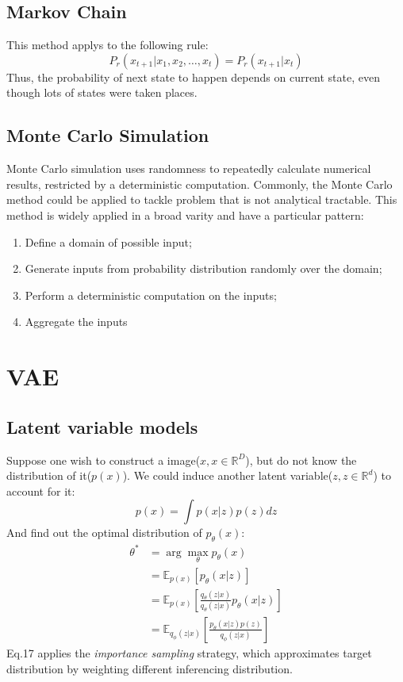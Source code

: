 \documentclass{article}
\newcommand{\argmax}{\arg\!\max}
\begin{document}
{\subsection{Markov Chain}
This method applys to the following rule:
\[
P_{r}(x_{t+1}|x_{1},x_{2},\dots ,x_{t}) = P_{r}(x_{t+1}|x_{t})
\]
Thus, the probability of next state to happen depends on current state, even though lots of states were taken places.
\subsection{Monte Carlo Simulation}
Monte Carlo simulation uses randomness to repeatedly calculate numerical results, restricted by a deterministic computation. Commonly, the Monte Carlo method could be applied to tackle problem that is not analytical tractable. This method is widely applied in a broad varity and have a particular pattern: \\
\begin{enumerate}
\item Define a domain of possible input;
\item Generate inputs from probability distribution randomly over the domain;
\item Perform a deterministic computation on the inputs;
\item Aggregate the inputs
\end{enumerate}
\section{VAE}
\subsection{Latent variable models}
Suppose one wish to construct a image($x, x\in \mathbb{R}^{D}$), but do not know the distribution of it($p(x)$). We could induce another latent variable($z, z\in \mathbb{R}^d$) to account for it:
\begin{equation}
p(x) = \int p(x|z)p(z)dz     
\end{equation}
And find out the optimal distribution of $p_{\theta}(x)$:
    \begin{align}
    \theta^{*} &= \argmax_{\theta} p_{\theta}(x)\\
    & =\mathbb{E}_{p(x)} [p_{\theta}(x|z)]\\ 
    & =\mathbb{E}_{p(x)} [\frac{q_{\theta}(z|x)}{q_{\theta}(z|x)}p_{\theta}(x|z)]\\
    & =\mathbb{E}_{q_{\phi}(z|x)}[\frac{p_{\theta}(x|z)p(z)}{q_{\phi}(z|x)}]
    \end{align}
Eq.17 applies the \textit{importance sampling} strategy, which approximates target distribution by weighting different inferencing distribution. 
}
\end{document}
